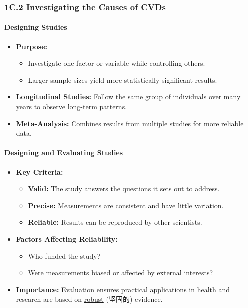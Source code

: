 
\subsubsection{1C.2 Investigating the Causes of CVDs}
\paragraph{Designing Studies}
\begin{itemize}
    \item \textbf{Purpose:}
    \begin{itemize}
        \item Investigate one factor or variable while controlling others.
        \item Larger sample sizes yield more statistically significant results.
    \end{itemize}
    \item \textbf{Longitudinal Studies:} Follow the same group of individuals over many years to observe long-term patterns.
    \item \textbf{Meta-Analysis:} Combines results from multiple studies for more reliable data.
\end{itemize}

\paragraph{Designing and Evaluating Studies}
\begin{itemize}
    \item \textbf{Key Criteria:}
    \begin{itemize}
        \item \textbf{Valid:} The study answers the questions it sets out to address.
        \item \textbf{Precise:} Measurements are consistent and have little variation.
        \item \textbf{Reliable:} Results can be reproduced by other scientists.
    \end{itemize}
    \item \textbf{Factors Affecting Reliability:}
    \begin{itemize}
        \item Who funded the study?
        \item Were measurements biased or affected by external interests?
    \end{itemize}
    \item \textbf{Importance:} Evaluation ensures practical applications in health and research are based on \underline{robust}
    (坚固的) evidence.
\end{itemize}

